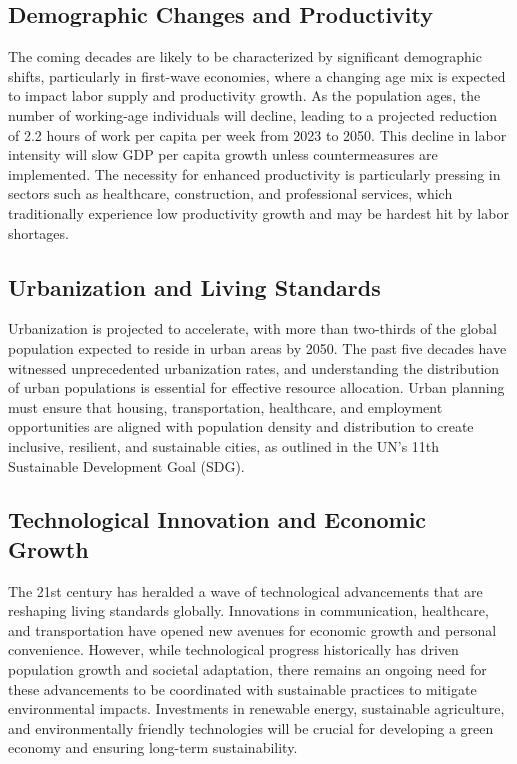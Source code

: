 \documentclass[12pt]{article}
\begin{document}
\subsection{Demographic Changes and Productivity}
The coming decades are likely to be characterized by significant demographic shifts,
particularly in first-wave economies, where a changing age mix is expected to
impact labor supply and productivity growth. As the population ages, the number of
working-age individuals will decline, leading to a projected reduction of 2.2 hours
of work per capita per week from 2023 to 2050. This decline in labor intensity
will slow GDP per capita growth unless countermeasures are implemented.
The necessity for enhanced productivity is particularly pressing in sectors such as
healthcare, construction, and professional services, which traditionally experience
low productivity growth and may be hardest hit by labor shortages.

\subsection{Urbanization and Living Standards}
Urbanization is projected to accelerate, with more than two-thirds of the global
population expected to reside in urban areas by 2050. The past five decades have
witnessed unprecedented urbanization rates, and understanding the distribution
of urban populations is essential for effective resource allocation. Urban planning
must ensure that housing, transportation, healthcare, and employment opportunities
are aligned with population density and distribution to create inclusive, resilient,
and sustainable cities, as outlined in the UN's 11th Sustainable Development Goal
(SDG).

\subsection{Technological Innovation and Economic Growth}
The 21st century has heralded a wave of technological advancements that are
reshaping living standards globally. Innovations in communication, healthcare, and
transportation have opened new avenues for economic growth and personal convenience.
However, while technological progress historically has driven population
growth and societal adaptation, there remains an ongoing need for these advancements
to be coordinated with sustainable practices to mitigate environmental impacts.
Investments in renewable energy, sustainable agriculture, and environmentally
friendly technologies will be crucial for developing a green economy and ensuring
long-term sustainability.
\end{document}
